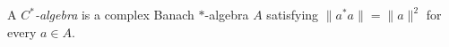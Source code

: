 
A \emph{$C^*$-algebra} is a complex Banach $*$-algebra $A$ satisfying $\|a^*a\|=\|a\|^2$ for every $a\in A$.
